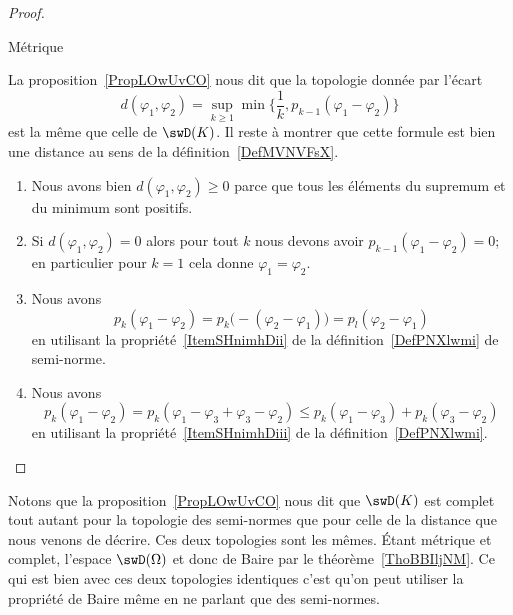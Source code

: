 \begin{proof}
\begin{subproof}
        \item[Métrique]

            La proposition~\ref{PropLOwUvCO} nous dit que la topologie donnée par l'écart
            \begin{equation}
                d(\varphi_1,\varphi_2)=\sup_{k\geq 1}\min\{ \frac{1}{ k },p_{k-1}(\varphi_1-\varphi_2) \}
            \end{equation}
            est la même que celle de \( \swD(K)\). Il reste à montrer que cette formule est bien une distance au sens de la définition~\ref{DefMVNVFsX}.
            \begin{enumerate}
                \item
                    Nous avons bien \( d(\varphi_1,\varphi_2)\geq 0\) parce que tous les éléments du supremum et du minimum sont positifs.
                \item
                    Si \( d(\varphi_1,\varphi_2)=0\) alors pour tout \( k\) nous devons avoir \( p_{k-1}(\varphi_1-\varphi_2)=0\); en particulier pour \( k=1\) cela donne \( \varphi_1=\varphi_2\).
                \item
                    Nous avons
                    \begin{equation}
                        p_k(\varphi_1-\varphi_2)=p_k\big( -(\varphi_2-\varphi_1) \big)=p_l(\varphi_2-\varphi_1)
                    \end{equation}
                    en utilisant la propriété~\ref{ItemSHnimhDii} de la définition~\ref{DefPNXlwmi} de semi-norme.
                \item
                    Nous avons
                    \begin{equation}
                        p_k(\varphi_1-\varphi_2)=p_k(\varphi_1-\varphi_3+\varphi_3-\varphi_2)\leq p_k(\varphi_1-\varphi_3)+p_k(\varphi_3-\varphi_2)
                    \end{equation}
                    en utilisant la propriété~\ref{ItemSHnimhDiii} de la définition~\ref{DefPNXlwmi}.
            \end{enumerate}
        \end{subproof}
\end{proof}
Notons que la proposition~\ref{PropLOwUvCO} nous dit que \( \swD(K)\) est complet tout autant pour la topologie des semi-normes que pour celle de la distance que nous venons de décrire. Ces deux topologies sont les mêmes. Étant métrique et complet, l'espace \( \swD(\Omega)\) et donc de Baire par le théorème~\ref{ThoBBIljNM}. Ce qui est bien avec ces deux topologies identiques c'est qu'on peut utiliser la propriété de Baire même en ne parlant que des semi-normes.

